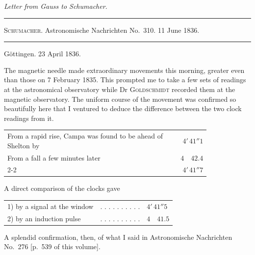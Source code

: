 \vspace{6mm}
\begin{center}
{\large\itshape Letter from Gauss to Schumacher.\par}
\vspace{5mm}\hrule\vspace{2mm}
{\small \textsc{Schumacher}. Astronomische Nachrichten No.\ 310. 11 June 1836.\par}
\vspace{2mm}\hrule\vspace{5mm}
\end{center}
\begin{flushright}Göttingen. 23 April 1836.\end{flushright}
The magnetic needle made extraordinary movements this morning, greater even than those on 7 February 1835. This prompted me to take a few sets of readings at the astronomical observatory while Dr \textsc{Goldschmidt} recorded them at the magnetic observatory. The uniform course of the movement was confirmed so beautifully here that I ventured to deduce the difference between the two clock readings from it.

\begin{center}\small
\begin{tabular}{@{}p{0.82\linewidth}r@{}}
From a rapid rise, Campa was found to be ahead of Shelton by & $4'\,41''1$\\
From a fall a few minutes later & $4\quad42.4$\\\cline{2-2}
\multicolumn{1}{r}{Mean} & $4'\,41''7$
\end{tabular}
\end{center}
A direct comparison of the clocks gave
\begin{center}\small
\begin{tabular}{@{}lll@{}}
1) by a signal at the window & . . . . . . . . . . & $4'\,41''5$\\
2) by an induction pulse & . . . . . . . . . . & $4\quad41.5$
\end{tabular}
\end{center}
A splendid confirmation, then, of what I said in Astronomische Nachrichten No.\ 276 [p.\ 539 of this volume].

\clearpage
